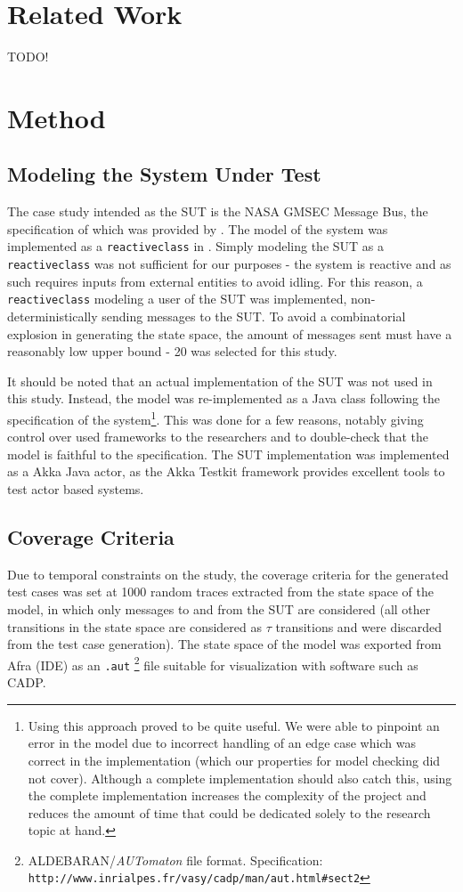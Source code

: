 \documentclass{article}
\begin{document}
	\section{Related Work}
	TODO!
		
	\section{Method}
		\subsection{Modeling the System Under Test}
			The case study intended as the SUT is the NASA GMSEC Message Bus, the specification of which was provided by \citeauthor{fraunhofer}. The model of the system was implemented as a \texttt{reactiveclass} in \Rebeca. Simply modeling the SUT as a \texttt{reactiveclass} was not sufficient for our purposes \-- the system is reactive and as such requires inputs from external entities to avoid idling. For this reason, a \texttt{reactiveclass} modeling a user of the SUT was implemented, non-deterministically sending messages to the SUT. To avoid a combinatorial explosion in generating the state space, the amount of messages sent must have a reasonably low upper bound \-- 20 was selected for this study.

			It should be noted that an actual implementation of the SUT was not used in this study. Instead, the model was re-implemented as a Java class following the specification of the system\footnote{Using this approach proved to be quite useful. We were able to pinpoint an error in the model due to incorrect handling of an edge case which was correct in the implementation (which our properties for model checking did not cover). Although a complete implementation should also catch this, using the complete implementation increases the complexity of the project and reduces the amount of time that could be dedicated solely to the research topic at hand. }. This was done for a few reasons, notably giving control over used frameworks to the researchers and to double-check that the model is faithful to the specification. The SUT implementation was implemented as a Akka Java actor, as the Akka Testkit framework provides excellent tools to test actor based systems.

		\subsection{Coverage Criteria}
			\label{sec:coveragecrit}
			Due to temporal constraints on the study, the coverage criteria for the generated test cases was set at 1000 random traces extracted from the state space of the model, in which only messages to and from the SUT are considered (all other transitions in the state space are considered as $\tau$ transitions and were discarded from the test case generation). The state space of the model was exported from Afra (\Rebeca IDE) as an \texttt{.aut}
			\footnote{ALDEBARAN/\textit{AUTomaton} file format. Specification: \texttt{http://www.inrialpes.fr/vasy/cadp/man/aut.html\#sect2}} file suitable for visualization with software such as CADP.
\end{document}
